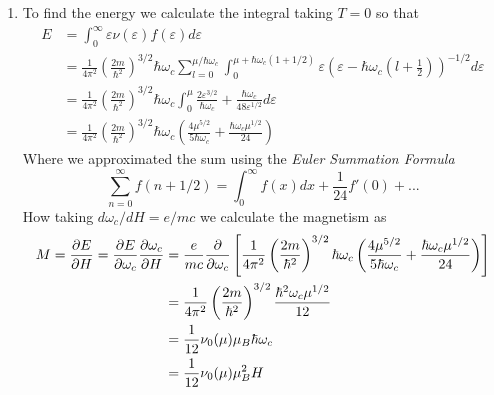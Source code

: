 \documentclass[11pt]{article}
\numberwithin{equation}{section}
\begin{document}
\begin{enumerate}[(1)]
\item To find the energy we calculate the integral taking $T=0$ so that
\begin{align*}
E &= \int_{0}^{\infty}\varepsilon\nu(\varepsilon)f(\varepsilon)d\varepsilon\\
&= \frac{1}{4\pi^2}\left(\frac{2m}{\hbar^2}\right)^{3/2}\hbar\omega_c\sum_{l=0}^{\mu/\hbar\omega_c}\int_{0}^{\mu+\hbar\omega_c(1+1/2)}\varepsilon\left(\varepsilon-\hbar\omega_c\left(l+\frac{1}{2}\right)\right)^{-1/2}d\varepsilon\\
&= \frac{1}{4\pi^2}\left(\frac{2m}{\hbar^2}\right)^{3/2}\hbar\omega_c\int_{0}^{\mu}\frac{2\varepsilon^{3/2}}{\hbar\omega_c}+\frac{\hbar\omega_c}{48\varepsilon^{1/2}}d\varepsilon\\
&= \frac{1}{4\pi^2}\left(\frac{2m}{\hbar^2}\right)^{3/2}\hbar\omega_c\left(\frac{4\mu^{5/2}}{5\hbar\omega_c}+\frac{\hbar\omega_c\mu^{1/2}}{24}\right)
\end{align*}
Where we approximated the sum using the \emph{Euler Summation Formula}
$$\sum_{n=0}^{\infty}f(n+1/2) = \int_{0}^{\infty}f(x)dx + \frac{1}{24}f'(0) + ...$$
How taking $d\omega_c/dH=e/mc$ we calculate the magnetism as
\begin{align*}
M = \frac{\partial{E}}{\partial{H}} = \frac{\partial{E}}{\partial{\omega_c}}\frac{\partial{\omega_c}}{\partial{H}} &= \frac{e}{mc}\frac{\partial{}}{\partial{\omega_c}}\left[\frac{1}{4\pi^2}\left(\frac{2m}{\hbar^2}\right)^{3/2}\hbar\omega_c\left(\frac{4\mu^{5/2}}{5\hbar\omega_c}+\frac{\hbar\omega_c\mu^{1/2}}{24}\right)\right]\\
&= \frac{1}{4\pi^2}\left(\frac{2m}{\hbar^2}\right)^{3/2}\frac{\hbar^2\omega_c\mu^{1/2}}{12}\\
&= \frac{1}{12}\nu_0(\mu)\mu_B\hbar\omega_c\\
&= \frac{1}{12}\nu_0(\mu)\mu_B^2H
\end{align*}
\end{enumerate}

\pagebreak
\end{document}

